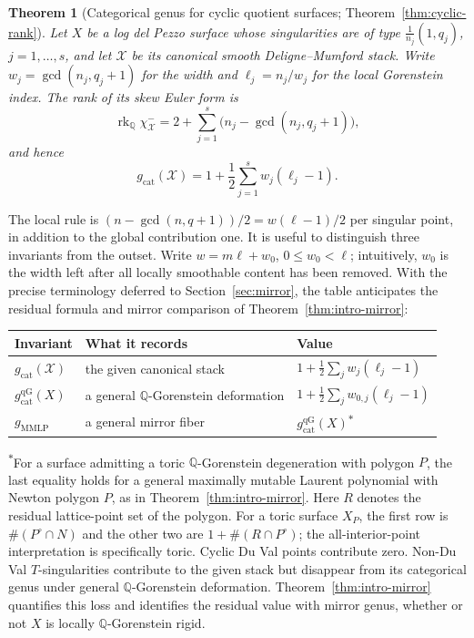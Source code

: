 \documentclass[11pt]{article}
\theoremstyle{plain}
\newtheorem{theorem}{Theorem}[section]
\theoremstyle{definition}
\theoremstyle{remark}
\newcommand{\cX}{\mathcal X}
\newcommand{\rk}{\operatorname{rk}}
\newcommand{\Q}{\mathbb Q}
\newcommand{\1}{\mathbf 1}
\begin{document}
\begin{theorem}[Categorical genus for cyclic quotient surfaces; Theorem~\ref{thm:cyclic-rank}]\label{thm:intro-cyclic}
Let $X$ be a log del Pezzo surface whose singularities are of type $\frac1{n_j}(1,q_j)$, $j=1,\dots,s$, and let $\cX$ be its canonical smooth Deligne--Mumford stack.  Write $w_j=\gcd(n_j,q_j+1)$ for the width and $\ell_j=n_j/w_j$ for the local Gorenstein index.  The rank of its skew Euler form is
\[
\rk_{\Q}\chi^-_{\cX}
=2+\sum_{j=1}^s\bigl(n_j-\gcd(n_j,q_j+1)\bigr),
\]
and hence
\[
g_{\mathrm{cat}}(\cX)
=1+\frac12\sum_{j=1}^s w_j(\ell_j-1).
\]
\end{theorem}

The local rule is $(n-\gcd(n,q+1))/2=w(\ell-1)/2$ per singular point, in addition to the global contribution one.  It is useful to distinguish three invariants from the outset.  Write $w=m\ell+w_0$, $0\le w_0<\ell$; intuitively, $w_0$ is the width left after all locally smoothable content has been removed.  With the precise terminology deferred to Section~\ref{sec:mirror}, the table anticipates the residual formula and mirror comparison of Theorem~\ref{thm:intro-mirror}:
\begin{center}
\renewcommand{\arraystretch}{1.25}
\begin{tabular}{@{}lll@{}}
\hline
Invariant & What it records & Value\\\hline
$g_{\mathrm{cat}}(\cX)$ & the given canonical stack
& $1+\frac12\sum_j w_j(\ell_j-1)$\\
$g_{\mathrm{cat}}^{\mathrm{qG}}(X)$ & a general $\Q$-Gorenstein deformation
& $1+\frac12\sum_j w_{0,j}(\ell_j-1)$\\
$g_{\mathrm{MMLP}}$ & a general mirror fiber
& $g_{\mathrm{cat}}^{\mathrm{qG}}(X)$\textsuperscript{$\ast$}\\\hline
\end{tabular}
\end{center}
\noindent\textsuperscript{$\ast$}For a surface admitting a toric $\Q$-Gorenstein degeneration with polygon $P$, the last equality holds for a general maximally mutable Laurent polynomial with Newton polygon $P$, as in Theorem~\ref{thm:intro-mirror}.  Here $R$ denotes the residual lattice-point set of the polygon.  For a toric surface $X_P$, the first row is $\#(P^\circ\cap N)$ and the other two are $1+\#(R\cap P^\circ)$; the all-interior-point interpretation is specifically toric.  Cyclic Du Val points contribute zero.  Non-Du Val $T$-singularities contribute to the given stack but disappear from its categorical genus under general $\Q$-Gorenstein deformation.  Theorem~\ref{thm:intro-mirror} quantifies this loss and identifies the residual value with mirror genus, whether or not $X$ is locally $\Q$-Gorenstein rigid.
\end{document}

